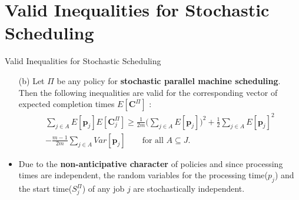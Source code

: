 \documentclass{beamer}
\begin{document}
\section{Valid Inequalities for Stochastic Scheduling}
\begin{frame}{Valid Inequalities for Stochastic Scheduling}
    \begin{itemize}
        \justifying    
        \item[(b)] Let $\Pi$ be any policy for \textbf{stochastic parallel machine scheduling}. Then the following inequalities are valid for the corresponding vector of expected completion times $E[\pmb{C}^\Pi]$ :
        \vspace{0.4cm}
        \begin{equation}
        \begin{split}
        \sum\limits_{j\in A}E[\pmb{p}_j]E[\pmb{C}_j^\Pi] \geq \frac{1}{2m} \Bigg(  \sum\limits_{j\in A}E[\pmb{p}_j]\Bigg)^2 + \frac{1}{2} \sum\limits_{j\in A}E[\pmb{p}_j]^2 
        \\ - \frac{m-1}{2m}\sum\limits_{j\in A}Var[\pmb{p}_j] 
        \qquad \text{for all } A \subseteq J. \end{split}
        \end{equation}
        \item Due to the \textbf{non-anticipative character} of policies and since processing times are independent, the random variables for the processing time($p_j$) and the start time($S_j^\Pi$) of any job $j$ are stochastically independent.
    \end{itemize}
\end{frame}
\end{document}
